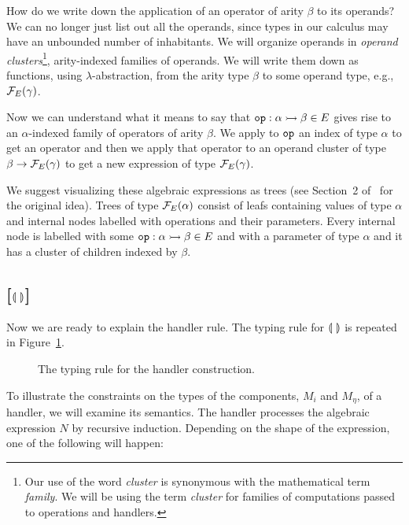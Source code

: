 \begin{itemize}
  How do we write down the application of an operator of arity $\beta$ to
  its operands? We can no longer just list out all the operands, since
  types in our calculus may have an unbounded number of inhabitants. We
  will organize operands in \emph{operand clusters}\footnote{Our use of the
  word \emph{cluster} is synonymous with the mathematical term
  \emph{family}. We will be using the term \emph{cluster} for families of
  computations passed to operations and handlers.}, arity-indexed families
  of operands. We will write them down as functions, using
  $\lambda$-abstraction, from the arity type $\beta$ to some operand type,
  e.g., $\mathcal{F}_E(\gamma)$.
\end{itemize}

Now we can understand what it means to say that
$\mathtt{op} : \alpha \rightarrowtail \beta \in E$ gives rise to an $\alpha$-indexed
family of operators of arity $\beta$. We apply to $\mathtt{op}$ an index of
type $\alpha$ to get an operator and then we apply that operator to an
operand cluster of type $\beta \to \mathcal{F}_E(\gamma)$ to get a new expression
of type $\mathcal{F}_E(\gamma)$.

We suggest visualizing these algebraic expressions as trees (see Section~2
of~\cite{lindley2014algebraic} for the original idea). Trees of type
$\mathcal{F}_E(\alpha)$ consist of leafs containing values of type $\alpha$ and
internal nodes labelled with operations and their parameters. Every
internal node is labelled with some $\mathtt{op} : \alpha \rightarrowtail \beta \in E$ and
with a parameter of type $\alpha$ and it has a cluster of children indexed
by $\beta$.

\subsection*{[$\llparenthesis \,  \, \rrparenthesis$]}

Now we are ready to explain the handler rule. The typing rule for
$\llparenthesis \,  \, \rrparenthesis$ is repeated in Figure~\ref{fig:handler-rule}.

\begin{figure}
  \handlerrule
  \caption{\label{fig:handler-rule} The typing rule for the handler
    construction.}
\end{figure}

To illustrate the constraints on the types of the components, $M_i$ and
$M_\eta$, of a handler, we will examine its semantics. The handler
processes the algebraic expression $N$ by recursive induction. Depending on
the shape of the expression, one of the following will happen:

